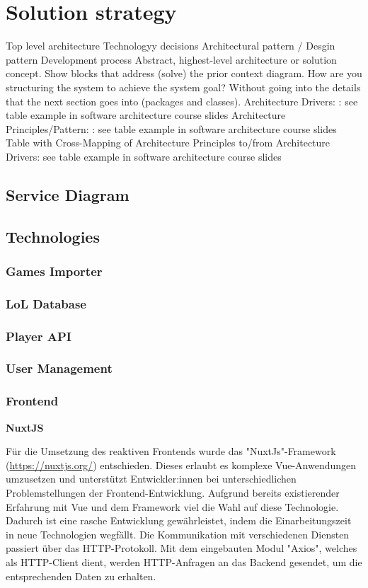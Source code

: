 \section{Solution strategy}
Top level architecture
Technologyy decisions
Architectural pattern / Desgin pattern
Development process
Abstract, highest-level architecture or solution concept. Show blocks that address (solve) the prior context diagram. How are you structuring the system to achieve the system goal? Without going into the details that the next section goes into (packages and classes).
Architecture Drivers: : see table example in software architecture course slides
Architecture Principles/Pattern: : see table example in software architecture course slides
Table with Cross-Mapping of Architecture Principles to/from Architecture Drivers: see table example in software architecture course slides

\subsection{Service Diagram}

\subsection{Technologies}

\subsubsection{Games Importer}

\subsubsection{LoL Database}

\subsubsection{Player API}

\subsubsection{User Management}

\subsubsection{Frontend}

\textbf{NuxtJS}

Für die Umsetzung des reaktiven Frontends wurde das "NuxtJs"-Framework (\href{https://nuxtjs.org/}{https://nuxtjs.org/}) entschieden. Dieses erlaubt es komplexe Vue-Anwendungen umzusetzen und unterstützt Entwickler:innen
bei unterschiedlichen Problemstellungen der Frontend-Entwicklung. Aufgrund bereits existierender Erfahrung mit Vue und dem Framework viel die Wahl auf diese Technologie.
Dadurch ist eine rasche Entwicklung gewährleistet, indem die Einarbeitungszeit in neue Technologien wegfällt. Die Kommunikation mit verschiedenen Diensten passiert
über das HTTP-Protokoll. Mit dem eingebauten Modul "Axios", welches als HTTP-Client dient, werden HTTP-Anfragen an das Backend gesendet, um die entsprechenden Daten 
zu erhalten.

